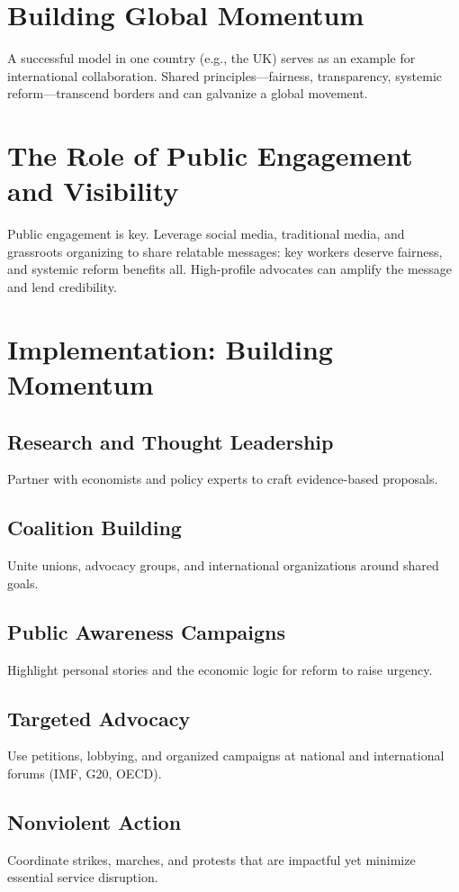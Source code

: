 \documentclass[11pt,a4paper]{article}
\begin{document}
\section{Building Global Momentum}
A successful model in one country (e.g., the UK) serves as an example for international collaboration. Shared principles—fairness, transparency, systemic reform—transcend borders and can galvanize a global movement.

\section{The Role of Public Engagement and Visibility}
Public engagement is key. Leverage social media, traditional media, and grassroots organizing to share relatable messages: key workers deserve fairness, and systemic reform benefits all. High-profile advocates can amplify the message and lend credibility.

\section{Implementation: Building Momentum}
\subsection{Research and Thought Leadership}
Partner with economists and policy experts to craft evidence-based proposals.

\subsection{Coalition Building}
Unite unions, advocacy groups, and international organizations around shared goals.

\subsection{Public Awareness Campaigns}
Highlight personal stories and the economic logic for reform to raise urgency.

\subsection{Targeted Advocacy}
Use petitions, lobbying, and organized campaigns at national and international forums (IMF, G20, OECD).

\subsection{Nonviolent Action}
Coordinate strikes, marches, and protests that are impactful yet minimize essential service disruption.
\end{document}
